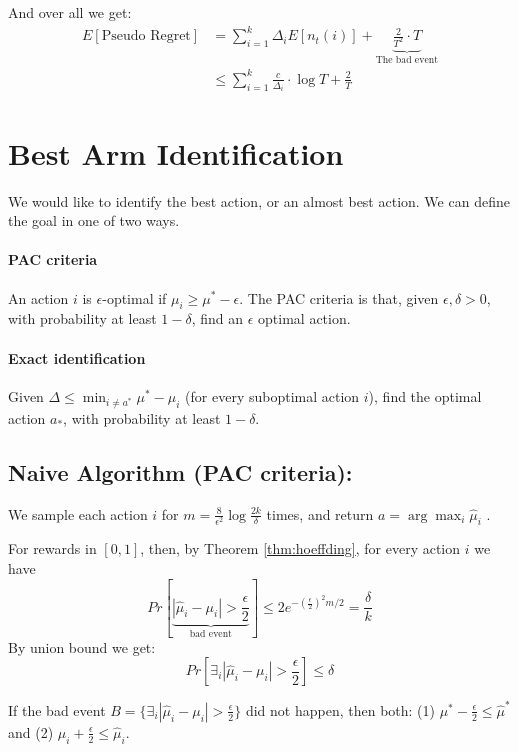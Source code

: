 And over all we get:
\begin{align*}
E\left[\text{Pseudo Regret}\right] & =
\sum_{i=1}^{k}\Delta_{i}E\left[n_{t}(i)\right]+\underbrace{\frac{2}{T^{2}}\cdot
T}_{\text{The bad event}}
\\
 & \le  \sum_{i=1}^{k}\frac{c}{\Delta_{i}}\cdot\log T+\frac{2}{T}
\end{align*}

\section{Best Arm Identification}

We would like to identify the best action, or an almost best action.
We can define the goal in one of two ways.

\paragraph{PAC criteria }
An action $i$ is $\epsilon$-optimal if  $\mu_i\geq \mu^*-\epsilon$. The PAC criteria is
that, given $\epsilon,\delta>0$, with probability at least
$1-\delta$, find an $\epsilon$ optimal action.

\paragraph{Exact identification}
Given $\Delta\le\min_{i\neq a^*}\mu^{*}-\mu_{i}$ (for every suboptimal action $i$),
find the optimal action $a_{*}$, with probability at least
$1-\delta$.

\subsection{Naive Algorithm (PAC criteria):}

We sample each action $i$ for
$m=\frac{8}{\epsilon^{2}}\log\frac{2k}{\delta}$ times, and return
$a= \arg\max_{i}\hat{\mu}_{i}$ .

For rewards in $[ 0 ,1]$, then, by Theorem \ref{thm:hoeffding}, for
every action $i$ we have
\[
Pr\left[\underbrace{\left|\hat{\mu}_{i}-\mu_{i}\right|>\frac{\epsilon}{2}}_{\text{bad
event}}\right]\le 2
e^{-\left(\frac{\epsilon}{2}\right)^{2}m/2}=\frac{\delta}{k}
\]
By union bound we get:
\[
Pr\left[\exists_{i}\left|\hat{\mu}_{i}-\mu_{i}\right|>\frac{\epsilon}{2}\right]\le\delta
\]

If the bad event
$B=\{\exists_{i}\left|\hat{\mu}_{i}-\mu_{i}\right|>\frac{\epsilon}{2}\}$
did not happen, then both: (1)
$\mu^{*}-\frac{\epsilon}{2}\le\hat{\mu}^{*}$ and (2)
$\mu_{i}+\frac{\epsilon}{2}\le\hat{\mu}_{i}$.

